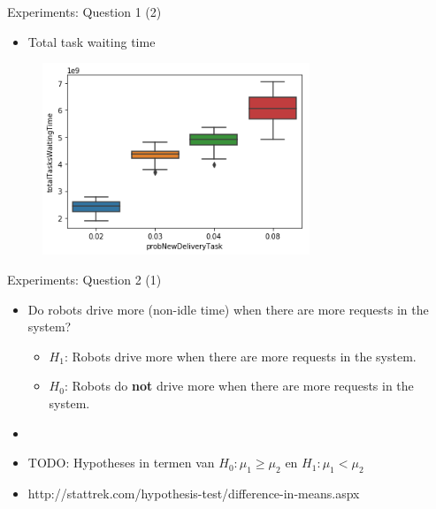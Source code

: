 \begin{frame}{Experiments: Question 1 (2)}
    \begin{itemize}
        \item Total task waiting time
    \end{itemize}

    \begin{figure}[hbt]
        \includegraphics[width=8cm]{imgs/question1-plot1}
    \end{figure}
\end{frame}


\begin{frame}{Experiments: Question 2 (1)}
    \begin{itemize}
        \item Do robots drive more (non-idle time) when there are more requests in the system?
        \begin{itemize}
                \item $H_1$: Robots drive more when there are more requests in the system.
                \item $H_0$: Robots do \textbf{not} drive more when there are more requests in the system.
        \end{itemize}

        \item[]
        \item TODO: Hypotheses in termen van $H_0: \mu_1 \geq \mu_2$ en $H_1: \mu_1 < \mu_2$
        \item http://stattrek.com/hypothesis-test/difference-in-means.aspx
    \end{itemize}
\end{frame}

